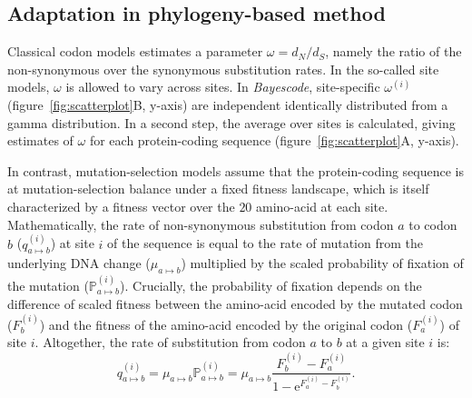 \documentclass{article}
\newcommand{\e}{\mathrm{e}}
\newcommand{\dn}{d_N}
\newcommand{\ds}{d_S}
\newcommand{\dnds}{\dn / \ds}
\newcommand{\proba}{\mathbb{P}}
\begin{document}
    \subsection*{Adaptation in phylogeny-based method}
    Classical codon models estimates a parameter $\omega=\dnds$, namely the ratio of the non-synonymous over the synonymous substitution rates\cite{muse_likelihood_1994,goldman_codonbased_1994}.
    In the so-called site models, $\omega$ is allowed to vary across sites\cite{yang_codonsubstitution_2000, huelsenbeck_dirichlet_2006}.
    In \textit{Bayescode}, site-specific $\omega^{(i)}$ (figure~\ref{fig:scatterplot}B, y-axis) are independent identically distributed from a gamma distribution\cite{lartillot_phylobayes_2013}.
    In a second step, the average over sites is calculated, giving estimates of $\omega$ for each protein-coding sequence (figure~\ref{fig:scatterplot}A, y-axis).

    In contrast, mutation-selection models assume that the protein-coding sequence is at mutation-selection balance under a fixed fitness landscape, which is itself characterized by a fitness vector over the $20$ amino-acid at each site\cite{yang_mutationselection_2008, halpern_evolutionary_1998, rodrigue_mechanistic_2010}.
    Mathematically, the rate of non-synonymous substitution from codon $a$ to codon $b$ ($q_{a \mapsto b}^{(i)}$) at site $i$ of the sequence is equal to the rate of mutation from the underlying DNA change ($\mu_{a \mapsto b}$) multiplied by the scaled probability of fixation of the mutation ($\proba_{a \mapsto b}^{(i)}$).
    Crucially, the probability of fixation depends on the difference of scaled fitness between the amino-acid encoded by the mutated codon ($F_b^{(i)}$) and the fitness of the amino-acid encoded by the original codon ($F_a^{(i)}$) of site $i$\cite{wright_evolution_1931, fisher_genetical_1930}.
    Altogether, the rate of substitution from codon $a$ to $b$ at a given site $i$ is:
    \begin{equation}
        q_{a \mapsto b}^{(i)} = \mu_{a \mapsto b} \proba_{a \mapsto b}^{(i)} = \mu_{a \mapsto b} \dfrac{F_b^{(i)} - F_a^{(i)}}{1 - \e^{F_a^{(i)} - F_b^{(i)}}}.
    \end{equation}
\end{document}
